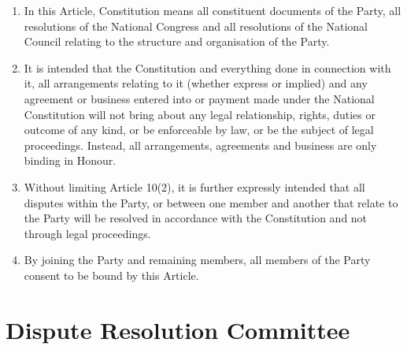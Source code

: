 \documentclass[a4paper,titlepage,8.5pt]{article}
\begin{document}
\begin{enumerate}
\item In this Article, Constitution means all constituent documents of the Party, all resolutions of the National Congress and all resolutions of the National Council relating to the structure and organisation of the Party.
\item It is intended that the Constitution and everything done in connection with it, all arrangements relating to it (whether express or implied) and any agreement or business entered into or payment made under the National Constitution will not bring about any legal relationship, rights, duties or outcome of any kind, or be enforceable by law, or be the subject of legal proceedings. Instead, all arrangements, agreements and business are only binding in Honour.
\item Without limiting Article 10(2), it is further expressly intended that all disputes within the Party, or between one member and another that relate to the Party will be resolved in accordance with the Constitution and not through legal proceedings.
\item By joining the Party and remaining members, all members of the Party consent to be bound by this Article.
\end{enumerate}

\section{Dispute Resolution Committee}
 
\end{document}
